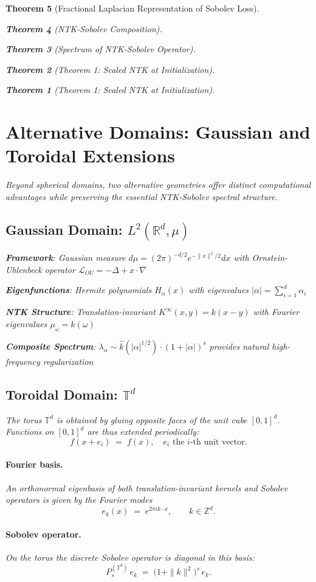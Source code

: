 \documentclass{article}
\newtheorem{theorem}{Theorem}[section]
\begin{document}
\begin{theorem}[Fractional Laplacian Representation of Sobolev Loss]
\begin{theorem}[NTK-Sobolev Composition]
\begin{theorem}[Spectrum of NTK-Sobolev Operator]
\begin{theorem}[Theorem 1: Scaled NTK at Initialization]
\begin{theorem}[Theorem 1: Scaled NTK at Initialization]
\section{Alternative Domains: Gaussian and Toroidal Extensions}

Beyond spherical domains, two alternative geometries offer distinct computational advantages while preserving the essential NTK-Sobolev spectral structure.

\subsection{Gaussian Domain: $L^2(\mathbb{R}^d, \mu)$}

\textbf{Framework}: Gaussian measure $d\mu = (2\pi)^{-d/2} e^{-\|x\|^2/2} dx$ with Ornstein-Uhlenbeck operator $\mathcal{L}_{OU} = -\Delta + x \cdot \nabla$

\textbf{Eigenfunctions}: Hermite polynomials $H_{\alpha}(x)$ with eigenvalues $|\alpha| = \sum_{i=1}^d \alpha_i$

\textbf{NTK Structure}: Translation-invariant $K^{\infty}(x, y) = k(x - y)$ with Fourier eigenvalues $\mu_\omega = \hat{k}(\omega)$

\textbf{Composite Spectrum}: $\lambda_\alpha \sim \hat{k}(|\alpha|^{1/2}) \cdot (1 + |\alpha|)^s$ provides natural high-frequency regularization

\subsection{Toroidal Domain: $\mathbb{T}^d$}

The torus $\mathbb{T}^d$ is obtained by gluing opposite faces of the unit cube $[0,1]^d$.  Functions on $[0,1]^d$ are thus extended periodically:
\[
  f(x+e_i) \;=\; f(x), \quad e_i \text{ the } i\text{-th unit vector.}
\]

\paragraph{Fourier basis.}  An orthonormal eigenbasis of both translation-invariant kernels and Sobolev operators is given by the Fourier modes
\[
   e_k(x) \;=\; e^{2\pi i k\cdot x}, \qquad k\in\mathbb Z^d.
\]

\paragraph{Sobolev operator.}  On the torus the discrete Sobolev operator is diagonal in this basis:
\[
   P_s^{(\mathbb{T}^d)}\,e_k\;=\;\bigl(1+\|k\|^2\bigr)^{s}\,e_k.
\]


\end{theorem}
\end{theorem}
\end{theorem}
\end{theorem}
\end{theorem}
\end{document}
